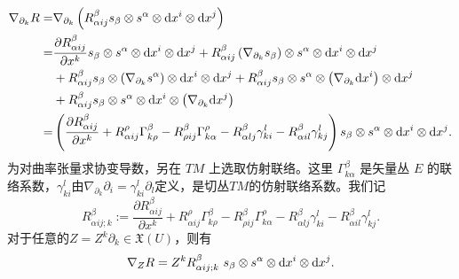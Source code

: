 \begin{align*}
	\nabla_{\partial_k} R = & \nabla_{\partial_k}\left(	R_{\alpha i j}^\beta
	s_\beta \otimes s^{\alpha}\otimes \dd x^i \otimes \dd x^j \right) \\
	=& \frac{\partial R_{\alpha i j}^\beta }{\partial x^k}
	s_\beta \otimes s^{\alpha}\otimes \dd x^i \otimes \dd x^j
	+ R_{\alpha i j}^\beta \left( \nabla_{\partial_k} s_\beta \right)
	\otimes s^{\alpha}\otimes \dd x^i \otimes \dd x^j \\
	& + R_{\alpha i j}^\beta s_\beta \otimes
	\left( \nabla_{\partial_k} s^{\alpha} \right) \otimes \dd x^i \otimes \dd x^j
	+ R_{\alpha i j}^\beta s_\beta \otimes s^{\alpha}\otimes
	\left( \nabla_{\partial_k} \dd x^i \right) \otimes  \dd x^j \\
	&+ R_{\alpha i j}^\beta s_\beta \otimes s^{\alpha}\otimes \dd x^i
	\otimes \left( \nabla_{\partial_k} \dd x^j \right) \\
	=&\left( \frac{\partial R_{\alpha i j}^\beta }{\partial x^k}
	+ R_{\alpha i j}^\rho \Gamma^\beta_{k \rho}
	- R_{\rho i j}^\beta \Gamma^\rho_{k \alpha}
	- R_{\alpha l j}^\beta \gamma^l_{k i}
	- R_{\alpha i l}^\beta \gamma^l_{k j}	\right)
	s_\beta \otimes s^{\alpha}\otimes \dd x^i \otimes \dd x^j .
\end{align*}
为对曲率张量求协变导数，另在 $TM$ 上选取仿射联络。这里 $\Gamma^\beta_{k \alpha}$ 是矢量丛 $E$ 的联络系数，$\gamma^l_{k i}$由$\nabla_{\partial_k}\partial_i=\gamma^l_{k i}\partial_l$定义，是切丛$TM$的仿射联络系数。我们记
\begin{equation}\label{chfb:eqn_RijDk}
	 R_{\alpha i j ; k}^\beta := \frac{\partial R_{\alpha i j}^\beta }{\partial x^k}
	+ R_{\alpha i j}^\rho \Gamma^\beta_{k \rho}
	- R_{\rho i j}^\beta \Gamma^\rho_{k \alpha}
	- R_{\alpha l j}^\beta \gamma^l_{k i}
	- R_{\alpha i l}^\beta \gamma^l_{k j} .
\end{equation}
对于任意的$ Z = Z^k \partial_k \in \mathfrak{X}(U)$，则有
\begin{equation}
	\nabla_{Z} R = Z^k R_{\alpha i j ; k}^\beta \
	s_\beta \otimes s^{\alpha}\otimes \dd x^i \otimes \dd x^j .
\end{equation}

